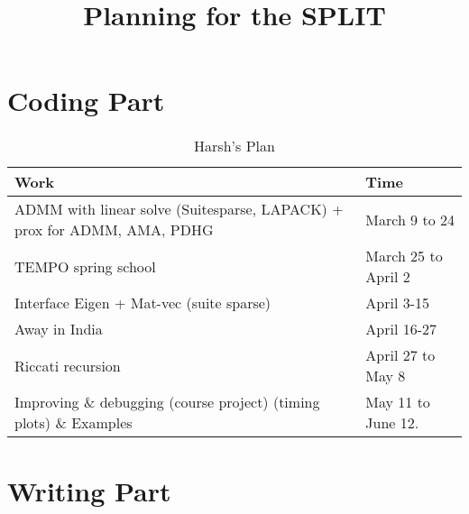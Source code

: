 \documentclass[]{article}
\begin{document}
\title{Planning for the SPLIT}
\date{}
\maketitle

\section{Coding Part}


\begin{table}[h]
\begin{tabular}{|l|l|}
\hline
\textbf{Work}  & \textbf{Time} \\ \hline
ADMM with linear solve (Suitesparse, LAPACK) + prox for ADMM, AMA, PDHG  & March 9 to 24 \\ \hline
TEMPO spring school & March 25 to April 2 \\ \hline
Interface Eigen + Mat-vec (suite sparse) &  April 3-15 \\ \hline
Away in India & April 16-27 \\ \hline 

Riccati recursion & April 27 to May 8 \\ \hline 
Improving \& debugging (course project) (timing plots) \& Examples & May 11 to June 12. \\ \hline 
\end{tabular}

\caption{Harsh's Plan }
\label{tab:harsh_plan}
\end{table}

\section{Writing Part}
\end{document}
